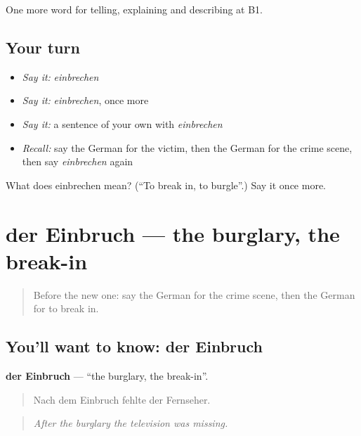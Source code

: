 \begin{grammarlens}[title={What you've built}]
One more word for telling, explaining and describing at B1.
\end{grammarlens}

\subsection*{Your turn}
\begin{itemize}
\raggedright
  \item \emph{Say it:} \emph{einbrechen}
  \item \emph{Say it:} \emph{einbrechen}, once more
  \item \emph{Say it:} a sentence of your own with \emph{einbrechen}
  \item \emph{Recall:} say the German for the victim, then the German for the crime scene, then say \emph{einbrechen} again
\end{itemize}

\begin{tcolorbox}[breakable,colback=teal!4,colframe=teal!35!black,title={Before you move on}]
What does einbrechen mean? (\textquotedblleft{}To break in, to burgle\textquotedblright{}.) Say it once more.
\end{tcolorbox}
\section[der Einbruch]{der Einbruch — the burglary, the break-in}

\label{lesson:GE-C281-einbruch}



\begin{quote}
Before the new one: say the German for the crime scene, then the German for to break in.
\end{quote}

\subsection*{You'll want to know: der Einbruch}
\textbf{der Einbruch} — \textquotedblleft{}the burglary, the break-in\textquotedblright{}.

\begin{quote}
Nach dem Einbruch fehlte der Fernseher.
\end{quote}

\begin{quote}
\emph{After the burglary the television was missing.}
\end{quote}

